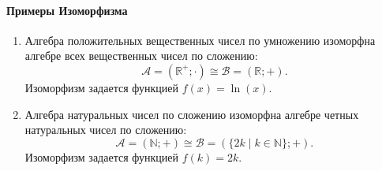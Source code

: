 \paragraph{Примеры Изоморфизма}
\begin{enumerate}
    \item Алгебра положительных вещественных чисел по умножению изоморфна алгебре всех вещественных чисел по сложению:
    $$\mathcal{A} = (\mathbb{R}^+; \cdot) \cong \mathcal{B} = (\mathbb{R}; +).$$
    Изоморфизм задается функцией $f(x) = \ln(x)$.
    \item Алгебра натуральных чисел по сложению изоморфна алгебре четных натуральных чисел по сложению:
    $$\mathcal{A} = (\mathbb{N}; +) \cong \mathcal{B} = (\{2k \mid k \in \mathbb{N}\}; +).$$
    Изоморфизм задается функцией $f(k) = 2k$.
\end{enumerate}